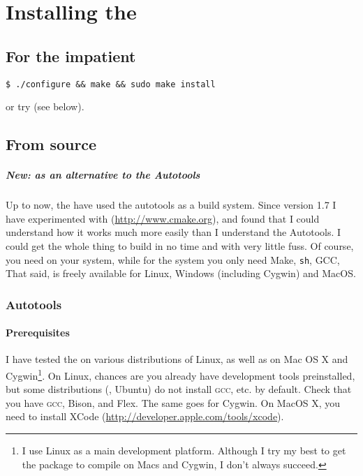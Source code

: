 \chapter{Installing the \nutils}
\label{app:installing}

\section{For the impatient}

\verb+$ ./configure && make && sudo make install+

or try \cmake{} (see below).



\section{From source}

\paragraph{New: \cmake{} as an alternative to the Autotools}
Up to now, the \nutils{} have used the \gnu{} autotools as a build system. Since
version 1.7 I have experimented with \cmake{} (\url{http://www.cmake.org}), and
found that I could understand how it works much more easily than I understand
the Autotools. I could get the whole thing to build in no time and with very
little fuss. Of course, you need \cmake{} on your system, while for the \gnu{}
system you only need Make, \texttt{sh}, GCC, \etc{} That said, \cmake{} is freely
available for Linux, Windows (including Cygwin) and MacOS.

\subsection{\gnu{} Autotools}

\subsubsection{Prerequisites}

I have tested the \nutils{} on various distributions of Linux, as well as on Mac
OS X and Cygwin\footnote{I use Linux as a main development platform.  Although I
try my best to get the package to compile on Macs and Cygwin, I don't always
succeed.}. On Linux, chances are you already have development tools
preinstalled, but some distributions (\eg, Ubuntu) do not install \textsc{gcc},
etc. by default. Check that you have \textsc{gcc}, Bison, and Flex. The same
goes for Cygwin. On MacOS X, you need to install XCode
(\url{http://developer.apple.com/tools/xcode}).

